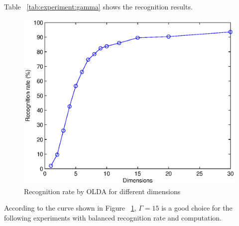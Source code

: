 

Table ~\ref{tab:experiment:gamma} shows the recognition results.

\begin{figure}[htb]
  \begin{center}
    \includegraphics[width=\linewidth]{ch-experiment/figures/gamma}
    \caption[Recognition rate by OLDA for different dimensions]{Recognition rate by OLDA for different dimensions}
    \label{fig:experiment:gamma}
  \end{center}
\end{figure}

According to the curve shown in Figure ~\ref{fig:experiment:gamma}, $\Gamma=15$ is a good choice for the following experiments with balanced recognition rate and computation.